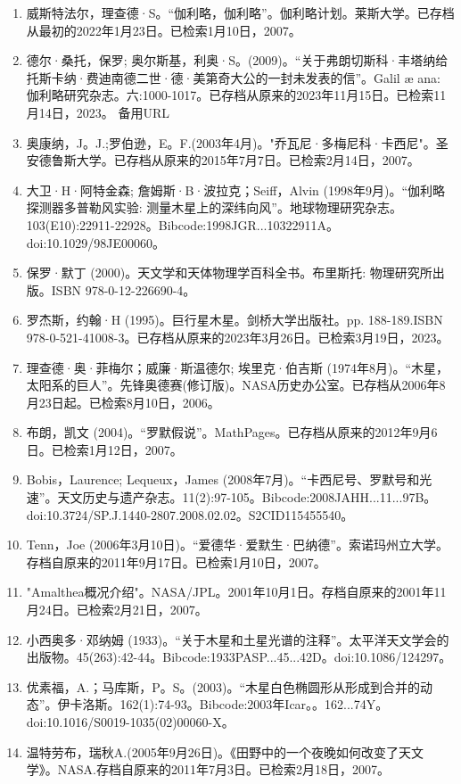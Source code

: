 \begin{enumerate}
\item 威斯特法尔，理查德·S。“伽利略，伽利略”。伽利略计划。莱斯大学。已存档从最初的2022年1月23日。已检索1月10日，2007。
\item 德尔·桑托，保罗; 奥尔斯基，利奥·S。(2009)。“关于弗朗切斯科·丰塔纳给托斯卡纳·费迪南德二世·德·美第奇大公的一封未发表的信”。Galil æ ana: 伽利略研究杂志。六:1000-1017。已存档从原来的2023年11月15日。已检索11月14日，2023。 备用URL
\item 奥康纳，J。J.;罗伯逊，E。F.(2003年4月)。"乔瓦尼·多梅尼科·卡西尼"。圣安德鲁斯大学。已存档从原来的2015年7月7日。已检索2月14日，2007。
\item 大卫·H·阿特金森; 詹姆斯·B·波拉克；Seiff，Alvin (1998年9月)。“伽利略探测器多普勒风实验: 测量木星上的深纬向风”。地球物理研究杂志。103(E10):22911-22928。Bibcode:1998JGR...10322911A。doi:10.1029/98JE00060。
\item 保罗·默丁 (2000)。天文学和天体物理学百科全书。布里斯托: 物理研究所出版。ISBN 978-0-12-226690-4。
\item 罗杰斯，约翰·H (1995)。巨行星木星。剑桥大学出版社。pp. 188-189.ISBN 978-0-521-41008-3。已存档从原来的2023年3月26日。已检索3月19日，2023。
\item 理查德·奥·菲梅尔；威廉·斯温德尔; 埃里克·伯吉斯 (1974年8月)。“木星，太阳系的巨人”。先锋奥德赛(修订版)。NASA历史办公室。已存档从2006年8月23日起。已检索8月10日，2006。
\item 布朗，凯文 (2004)。“罗默假说”。MathPages。已存档从原来的2012年9月6日。已检索1月12日，2007。
\item Bobis，Laurence; Lequeux，James (2008年7月)。“卡西尼号、罗默号和光速”。天文历史与遗产杂志。11(2):97-105。Bibcode:2008JAHH...11...97B。doi:10.3724/SP.J.1440-2807.2008.02.02。S2CID115455540。 
\item Tenn，Joe (2006年3月10日)。“爱德华·爱默生·巴纳德”。索诺玛州立大学。存档自原来的2011年9月17日。已检索1月10日，2007。
\item "Amalthea概况介绍"。NASA/JPL。2001年10月1日。存档自原来的2001年11月24日。已检索2月21日，2007。
\item 小西奥多·邓纳姆 (1933)。“关于木星和土星光谱的注释”。太平洋天文学会的出版物。45(263):42-44。Bibcode:1933PASP...45...42D。doi:10.1086/124297。
\item 优素福，A.；马库斯，P。S。(2003)。“木星白色椭圆形从形成到合并的动态”。伊卡洛斯。162(1):74-93。Bibcode:2003年Icar。。162...74Y。doi:10.1016/S0019-1035(02)00060-X。
\item 温特劳布，瑞秋A.(2005年9月26日)。《田野中的一个夜晚如何改变了天文学》。NASA.存档自原来的2011年7月3日。已检索2月18日，2007。

\end{enumerate}
